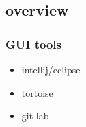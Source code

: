 \subsection{overview}
\begin{frame}
\frametitle{GUI tools}
	\begin{block}{}
		\begin{itemize}
			\item intellij/eclipse
			\item tortoise
			\item git lab
		\end{itemize}
	\end{block}
\end{frame}
